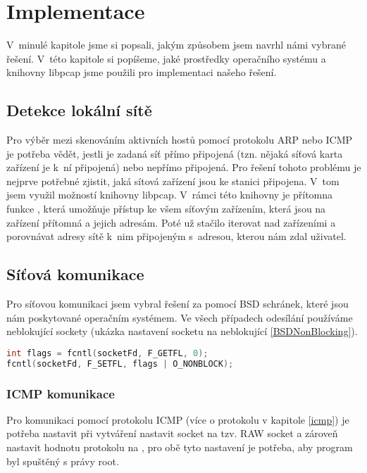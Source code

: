 \documentclass[../projekt.tex]{subfiles}
\begin{document}
\chapter{Implementace}

V~minulé kapitole jsme si popsali, jakým způsobem jsem navrhl námi vybrané řešení. V~této kapitole si popíšeme, jaké prostředky operačního systému a knihovny libpcap\cite{LibpcapReference} jsme použili pro implementaci našeho řešení.

\section{Detekce lokální sítě}
Pro výběr mezi skenováním aktivních hostů pomocí protokolu ARP nebo ICMP je potřeba vědět, jestli je zadaná síť přímo připojená (tzn. nějaká síťová karta zařízení je k~ní připojená) nebo nepřímo připojená. 
Pro řešení tohoto problému je nejprve potřebné zjistit, jaká sítová zařízení jsou ke stanici připojena. V~tom jsem využil možností knihovny libpcap\cite{LibpcapReference}. V~rámci této knihovny je přítomna funkce , která umožňuje přístup ke všem síťovým zařízením, která jsou na zařízení přítomná a jejich adresám. Poté už stačilo iterovat nad zařízeními a porovnávat adresy sítě k~nim připojeným s~adresou, kterou nám zdal uživatel.

\section{Síťová komunikace}

Pro síťovou komunikaci jsem vybral řešení za pomocí BSD schránek, které jsou nám poskytované operačním systémem. Ve všech případech odesílání používáme neblokující sockety (ukázka nastavení socketu na neblokující \autoref{BSDNonBlocking}). 

\begin{lstlisting}[language=c, label=BSDNonBlocking, caption= Nastavení socketu na neblokující.]
int flags = fcntl(socketFd, F_GETFL, 0);
fcntl(socketFd, F_SETFL, flags | O_NONBLOCK);
\end{lstlisting}

\subsection{ICMP komunikace}\label{ICMPComm}

Pro komunikaci pomocí protokolu ICMP (více o protokolu v kapitole \ref{icmp}) je potřeba nastavit při vytváření nastavit socket na tzv. RAW socket a zároveň nastavit hodnotu protokolu na , pro obě tyto nastavení je potřeba, aby program byl spuštěný s právy root. 
\end{document}
